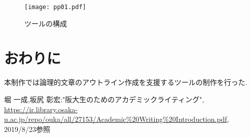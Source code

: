 \documentclass[twocolumn,10pt,a4j]{jsarticle}
\begin{document}
\begin{comment}
実装した機能として\textcircled{\scriptsize{1}}は「主張と根拠の対応」,\textcircled{\scriptsize{2}}は「課題に対する疑問とその答えの記入」,\textcircled{\scriptsize{3}}は「論理的な構成の整理」,\textcircled{\scriptsize{4}}「参考文献の管理」とする．
\textcircled{\scriptsize{1}}「主張と根拠」ではまず主張の表示をした.
また根拠は複数存在する可能性があるため根拠の追加も行えるようにした.
\textcircled{\scriptsize{2}}「問いと答え」では課題や主張への疑問とそれに対する答えを短い文章で記述し，見返した際に主張からずれた意見が出ることを防ぐことができると考え，課題や主張への疑問と答えを短い文章で記述する．
\textcircled{\scriptsize{3}}「論理的な構成」では論理的な文章を書く上で各内容の順番や序論，本論，結論のどの部分の情報なのかを整理するため順番を入れ替える機能，文章がどの章に情報なのか表示する機能にした．
\textcircled{\scriptsize{4}}「参考文献」では文章を作成する際の引用した文献を整理することが目的であり,どの文献が何章で参照を行ったのか確認できるように参考文献にはラベルを付けた.
\end{comment}

\begin{figure}[h]
\begin{center}
 \texttt{[image: pp01.pdf]}
\end{center}
 \caption{ツールの構成}
 \label{fig:教科書}
\end{figure}

\section{おわりに}
本制作では論理的文章のアウトライン作成を支援するツールの制作を行った.

\begin{thebibliography}{99}
 堀 一成,坂尻 彰宏:"阪大生のためのアカデミックライティング",
\url{https://ir.library.osaka-u.ac.jp/repo/ouka/all/27153/Academic%20Writing%20Introduction.pdf}, 2019/8/23参照


\end{thebibliography}
\end{document}
